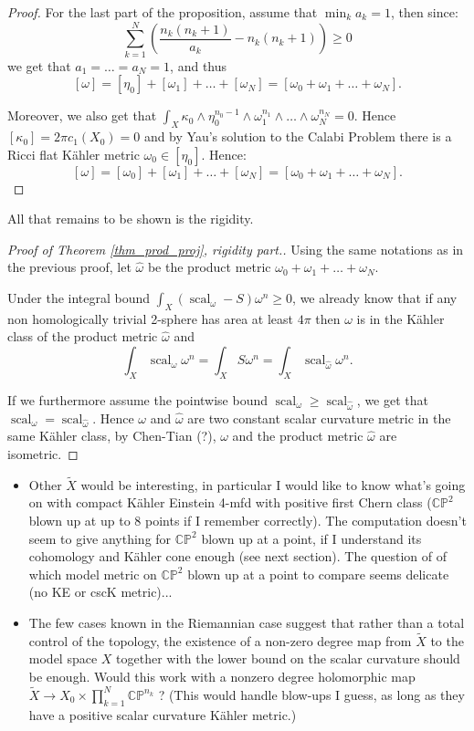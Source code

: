 \documentclass{amsart}
\numberwithin{equation}{section}
\theoremstyle{definition}
\DeclareMathOperator{\scal}{scal}
\begin{document}
\begin{proof}
For the last part of the proposition, assume that $\min_k a_k=1$, then since:
\[\sum_{k=1}^N\left(\frac{n_k(n_k+1)}{a_k}-n_k(n_k+1)\right)\geq 0\] we get that $a_1=\dots=a_N=1$, and thus
\[[\omega]=[\eta_0]+[\omega_1]+\dots+[\omega_N]=[\omega_0+\omega_1+\dots+\omega_N].\]

Moreover, we also get that $\int_X\kappa_0\wedge\eta_0^{n_0-1}\wedge\omega_1^{n_1}\wedge\dots\wedge\omega_N^{n_N}=0$. Hence $[\kappa_0]=2\pi c_1(X_0)=0$ and by Yau's solution to the Calabi Problem there is a Ricci flat K\"ahler metric $\omega_0\in[\eta_0]$. Hence:
\[[\omega]=[\omega_0]+[\omega_1]+\dots+[\omega_N]=[\omega_0+\omega_1+\dots+\omega_N].\]

\end{proof}

All that remains to be shown is the rigidity.
\begin{proof}[Proof of Theorem \ref{thm_prod_proj}, rigidity part.]
Using the same notations as in the previous proof, let $\hat\omega$ be the product metric $\omega_0+\omega_1+\dots+\omega_N$.

Under the integral bound $\int_X(\scal_\omega-S)\omega^n\geq 0$, we already know that if any non homologically trivial 2-sphere has area at least $4\pi$ then $\omega$ is in the K\"ahler class of the product metric $\hat\omega$ and \[\int_X\scal_\omega\omega^n=\int_X S\omega^n=\int_X\scal_{\hat\omega}\omega^n.\]

If we furthermore assume the pointwise bound $\scal_\omega\geq\scal_{\hat\omega}$, we get that $\scal_\omega=\scal_{\hat\omega}$. Hence $\omega$ and $\hat\omega$ are two constant scalar curvature metric in the same K\"ahler class, by Chen-Tian (?), $\omega$ and the product metric $\hat\omega$ are isometric.
\end{proof}



\begin{itemize}
\item Other $\tilde X$ would be interesting, in particular I would like to know what's going on with compact K\"ahler Einstein 4-mfd with positive first Chern class ($\mathbb{CP}^2$ blown up at up to 8 points if I remember correctly). The computation doesn't seem to give anything for $\mathbb{CP}^2$ blown up at a point, if I understand its cohomology and K\"ahler cone enough (see next section). The question of of which model metric on $\mathbb{CP}^2$ blown up at a point to compare seems delicate (no KE or cscK metric)...
\item The few cases known in the Riemannian case suggest that rather than a total control of the topology, the existence of a non-zero degree map from $\tilde X$ to the model space $X$ together with the lower bound on the scalar curvature should be enough. Would this work with a nonzero degree holomorphic map  $\tilde X\to X_0\times\prod_{k=1}^N\mathbb{CP}^{n_k}$ ? (This would handle blow-ups I guess, as long as they have a positive scalar curvature K\"ahler metric.)
\end{itemize}
\end{document}
